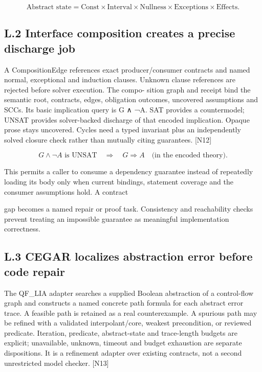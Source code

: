 \documentclass{article}
\begin{document}
\setcounter{equation}{3}
\begin{equation}
\text{Abstract state}=\mathrm{Const}\times\mathrm{Interval}\times\mathrm{Nullness}\times\mathrm{Exceptions}\times\mathrm{Effects}.
\tag{4}\end{equation}

\subsection*{L.2 Interface composition creates a precise discharge job}

A CompositionEdge references exact producer/consumer contracts and named normal, exceptional
and induction clauses. Unknown clause references are rejected before solver execution. The compo-
sition graph and receipt bind the semantic root, contracts, edges, obligation outcomes, uncovered
assumptions and SCCs. Its basic implication query is G ∧ ¬A. SAT provides a countermodel;
UNSAT provides solver-backed discharge of that encoded implication. Opaque prose stays uncovered.
Cycles need a typed invariant plus an independently solved closure check rather than mutually citing
guarantees. [N12]

\setcounter{equation}{4}
\begin{equation}
G\land\neg A\text{ is UNSAT}\quad\Rightarrow\quad G\Rightarrow A\quad\text{(in the encoded theory).}
\tag{5}\end{equation}

This permits a caller to consume a dependency guarantee instead of repeatedly loading its body
only when current bindings, statement coverage and the consumer assumptions hold. A contract


gap becomes a named repair or proof task. Consistency and reachability checks prevent treating an
impossible guarantee as meaningful implementation correctness.

\subsection*{L.3 CEGAR localizes abstraction error before code repair}

The QF\_LIA adapter searches a supplied Boolean abstraction of a control-flow graph and constructs
a named concrete path formula for each abstract error trace. A feasible path is retained as a
real counterexample. A spurious path may be refined with a validated interpolant/core, weakest
precondition, or reviewed predicate. Iteration, predicate, abstract-state and trace-length budgets
are explicit; unavailable, unknown, timeout and budget exhaustion are separate dispositions. It is a
refinement adapter over existing contracts, not a second unrestricted model checker. [N13]
\end{document}
